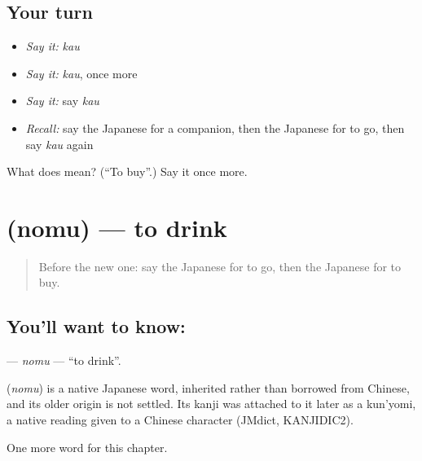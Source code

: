\subsection*{Your turn}
\begin{itemize}
\raggedright
  \item \emph{Say it:} \emph{kau}
  \item \emph{Say it:} \emph{kau}, once more
  \item \emph{Say it:} say \emph{kau}
  \item \emph{Recall:} say the Japanese for a companion, then the Japanese for to go, then say \emph{kau} again
\end{itemize}

\begin{tcolorbox}[breakable,colback=teal!4,colframe=teal!35!black,title={Before you move on}]
What does  mean? (\textquotedblleft{}To buy\textquotedblright{}.) Say it once more.
\end{tcolorbox}
\section[\texorpdfstring{\ja{のむ} (nomu)}{のむ (nomu)}]{ (nomu) — to drink}

\label{lesson:JA-C26-nomu}



\begin{quote}
Before the new one: say the Japanese for to go, then the Japanese for to buy.
\end{quote}

\subsection*{You'll want to know: }
\textbf{} — \emph{nomu} — \textquotedblleft{}to drink\textquotedblright{}.

\begin{cousinweb}
\textbf{} (\emph{nomu}) is a native Japanese word, inherited rather than borrowed from Chinese, and its older origin is not settled. Its kanji was attached to it later as a kun'yomi, a native reading given to a Chinese character (JMdict, KANJIDIC2).
\end{cousinweb}

\begin{grammarlens}[title={What you've built}]
One more word for this chapter.
\end{grammarlens}

